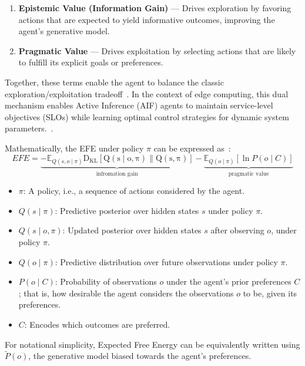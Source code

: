 \begin{enumerate}
  \item \textbf{Epistemic Value (Information Gain)} — Drives exploration by favoring actions that are expected to yield informative outcomes, improving the agent’s generative model.
  \item \textbf{Pragmatic Value} — Drives exploitation by selecting actions that are likely to fulfill its explicit goals or preferences.
\end{enumerate}

Together, these terms enable the agent to balance the classic exploration/exploitation tradeoff~\cite{sedlak_adaptive_2024, danilenka_adaptive_2025}. In the context of edge computing, this dual mechanism enables Active Inference (AIF) agents to maintain service-level objectives (SLOs) while learning optimal control strategies for dynamic system parameters.~\cite{lapkovskis_benchmarking_2025}.

Mathematically, the EFE under policy \(\pi\) can be expressed as~\cite{parr_active_2022}:
\begin{equation}
EFE=\underbrace{-\mathbb{E}_{Q(s, o \mid \pi)} \mathrm{D_{KL} \left[ Q(s \mid o, \pi) \parallel Q(s, \pi) \right] }}_{\text{infromation gain}} - \underbrace{\mathbb{E}_{Q(o \mid \pi)} \left[ \ln P(o \mid C) \right]}_{\text{pragmatic value}}
\label{eq:expected-free-energy-formal}
\end{equation}

\begin{itemize}
  \item \( \pi \): A policy, i.e., a sequence of actions considered by the agent.
  \item \( Q(s \mid \pi) \): Predictive posterior over hidden states \(s\) under policy \(\pi\).
  \item \( Q(s \mid o, \pi) \): Updated posterior over hidden states \(s\) after observing \(o\), under policy \(\pi\).
  \item \( Q(o \mid \pi) \): Predictive distribution over future observations under policy \(\pi\).
  \item \( P(o \mid C) \): Probability of observations \(o\) under the agent’s prior preferences \(C\); that is, how desirable the agent considers the observations \(o\) to be, given its preferences.
  \item \( C \): Encodes which outcomes are preferred.
\end{itemize}

For notational simplicity, Expected Free Energy can be equivalently written using \( \tilde{P}(o) \), the generative model biased towards the agent's preferences.

